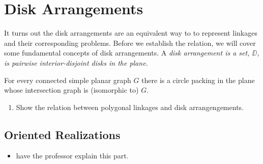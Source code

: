 \section{Disk Arrangements}
It turns out the disk arrangements are an equivalent way to to represent linkages and their corresponding problems.  Before we establish the relation, we will cover some fundamental concepts of disk arrangements.  
A \it{disk arrangement} is a set, $\DD$, is pairwise interior-disjoint disks in the plane.
\begin{thm}\label{thm2-1}
For every connected simple planar graph $G$ there is a circle packing in the
plane whose intersection graph is (isomorphic to) $G$.
\end{thm}


\begin{enumerate}%
\item Show the relation between polygonal linkages and disk arrangengements.
\end{enumerate} 
\subsection{Oriented Realizations}
\begin{itemize}
\item[\rn{1}]have the professor explain this part.
\end{itemize}  
